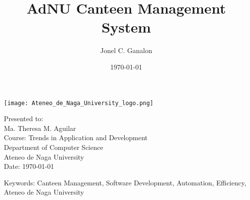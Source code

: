 \documentclass{article}
\title{AdNU Canteen Management System}
\author{Jonel C. Ganalon}
\date{\today} %
\begin{document}
\maketitle

\thispagestyle{empty} %

\begin{center}
    \vspace{2cm} %
    \texttt{[image: Ateneo\_de\_Naga\_University\_logo.png]} %

    \vspace{2cm} %
    Presented to: \\
    Ma. Theresa M. Aguilar \\
    Course: Trends in Application and Development \\
    Department of Computer Science \\
    Ateneo de Naga University \\
    \vspace{1cm} %
    Date: \today
    
    \vspace{0.5cm} %
    Keywords: Canteen Management, Software Development, Automation, Efficiency, Ateneo de Naga University
\end{center}
\end{document}
